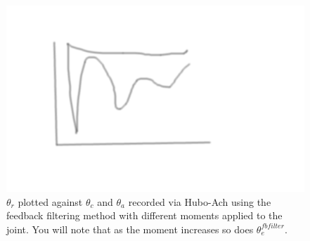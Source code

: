 \begin{figure}[thpb]
  \centering
\includegraphics[width=0.8\columnwidth]{./pix/tmp.png}
  \caption{$\theta_r$ plotted against $\theta_c$ and $\theta_a$ recorded via Hubo-Ach using the feedback filtering method with different moments applied to the joint.  You will note that as the moment increases so does $\theta_e^{fbfilter}$. }
  \label{fig:singleJointStepFilteredFeedbackMoment}
\end{figure}
